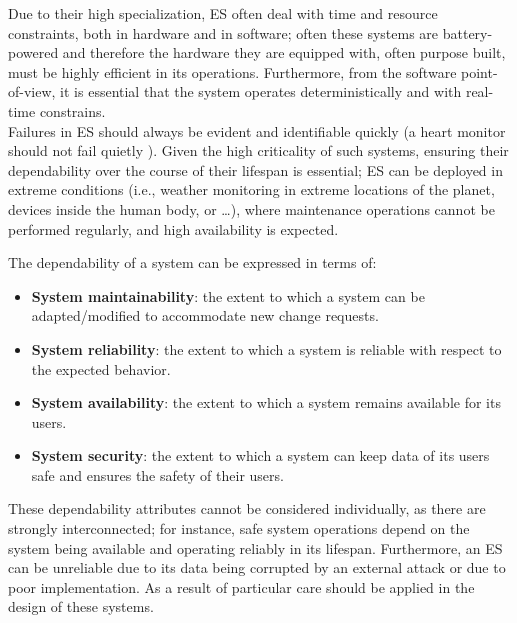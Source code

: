 Due to their high specialization, ES often deal with time and resource constraints, both in hardware and in software; often these systems are battery-powered and therefore the hardware they are equipped with, often purpose built, must be highly efficient in its operations. Furthermore, from the software point-of-view, it is essential that the system operates deterministically and with real-time constrains. \\
Failures in ES should always be evident and identifiable quickly (a heart monitor should not fail quietly \cite{MakingEmbeddedSystems}). Given the high criticality of such systems, ensuring their dependability over the course of their lifespan is essential; ES can be deployed in extreme conditions (i.e., weather monitoring in extreme locations of the planet, devices inside the human body, or \dots), where maintenance operations cannot be performed regularly,  and high availability is expected. 

The dependability of a system can be expressed in terms of:
\begin{itemize}
    \item \textbf{System maintainability}: the extent to which a system can be adapted/modified to accommodate new change requests.
    \item \textbf{System reliability}: the extent to which a system is reliable with respect to the expected behavior.
    \item \textbf{System availability}: the extent to which a system remains available for its users.
    \item \textbf{System security}: the extent to which a system can keep data of its users safe and ensures the safety of their users.
\end{itemize}

These dependability attributes cannot be considered individually, as there are strongly interconnected; for instance, safe system operations depend on the system being available and operating reliably in its lifespan. Furthermore, an ES can be unreliable due to its data being corrupted by an external attack or due to poor implementation. As a result of particular care should be applied in the design of these systems. 





